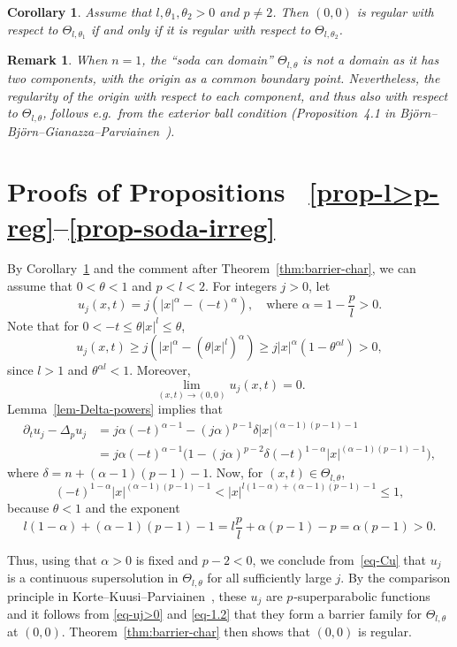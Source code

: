 \documentclass[a4paper, twoside]{article}
\makeatletter
\theoremstyle{propositional}
\newtheorem{cor}[thm]{Corollary}
\theoremstyle{descriptive}
\newtheorem{remark}[thm]{Remark}
\renewenvironment{proof}[1][\proofname]{\par
  \pushQED{\qed}%
  \normalfont
  \trivlist
  \item[\hskip\labelsep
        \itshape
    #1\@addpunct{.}]\ignorespaces
}{%
  \popQED\endtrivlist\@endpefalse
}
\numberwithin{equation}{section}
\newcommand{\al}{\alpha}
\newcommand{\de}{\delta}
\newcommand{\p}{{$p\mspace{1mu}$}}
\makeatother
\begin{document}
\begin{cor} \label{cor-indep-theta}
Assume that $l,\theta_1,\theta_2>0$ and $p \ne 2$. 
Then $(0,0)$ is regular 
with respect to  $\Theta_{l,\theta_1}$ 
if and only if it is
regular 
with respect to  $\Theta_{l,\theta_2}$. 
\end{cor}


\begin{remark} \label{rmk-n=1}
When $n=1$, the ``soda can domain'' $\Theta_{l,\theta}$ is not a domain as 
it has two components, with 
the origin as a common boundary point.
Nevertheless, 
the regularity of the origin with respect to 
each component, and thus also with respect to $\Theta_{l,\theta}$,
follows e.g.\ from
the exterior ball condition 
(Proposition~4.1 
in Bj\"orn--Bj\"orn--Gianazza--Par\-vi\-ain\-en~\cite{BBGP}).
\end{remark}



\section{Proofs of Propositions~
\ref{prop-l>p-reg}--\ref{prop-soda-irreg}
}
\label{sect-pf}

\begin{proof}[Proof of Proposition~\ref{prop-l>p-reg}]
By Corollary~\ref{cor-indep-theta} and the comment after Theorem~\ref{thm:barrier-char},
we can assume that $0<\theta<1$ and $p<l<2$.
For integers $j>0$, let 
\[
   u_j(x,t)= j(|x|^\al - (-t)^\al),
   \quad \text{where $\al=1-\frac{p}{l}>0$.}
\]
Note that for $0<-t \le \theta |x|^l \le \theta$,
\begin{equation}    \label{eq-uj>0}
u_j(x,t) \ge j(|x|^{\al} - (\theta|x|^l)^\al) 
\ge j|x|^\al (1-\theta^{\al l}) > 0,
\end{equation}
since $l>1$ and $\theta^{\al l} <1$.
Moreover, 
\begin{equation} \label{eq-1.2}
\lim_{(x,t)\to(0,0)} u_j(x,t)=0.
\end{equation}
Lemma~\ref{lem-Delta-powers} implies that
\begin{align}
\partial_t u_j 
- \Delta_p u_j &= j\al (-t)^{\al-1} - (j\al)^{p-1}\de |x|^{(\al-1)(p-1)-1} \nonumber \\
    &= j\al (-t)^{\al-1} \bigl( 1 - (j\al)^{p-2}\de (-t)^{1-\al}|x|^{(\al-1)(p-1)-1} \bigr),
\label{eq-Cu}
\end{align}
where $\de=n+(\al-1)(p-1)-1$. 
Now, for $(x,t) \in \Theta_{l,\theta}$,
\[
(-t)^{1-\al}|x|^{(\al-1)(p-1)-1} < |x|^{l(1-\al)+(\al-1)(p-1)-1} \le 1,
\]
because $\theta <1$ and the exponent 
\[ 
l(1-\al)+(\al-1)(p-1)-1 
= l \frac{p}{l} + \al(p-1)-p
= \al(p-1)>0.
\] 


Thus, using that $\al>0$ is fixed and $p-2<0$, we conclude from~\eqref{eq-Cu}
that $u_j$ is 
a continuous supersolution in $\Theta_{l,\theta}$ for 
all sufficiently large $j$.
By  the comparison principle in
Korte--Kuusi--Par\-vi\-ain\-en~\cite[Lemma~3.5]{KoKuPa10}, 
these $u_j$ are \p-superparabolic functions and it follows from \eqref{eq-uj>0}
and \eqref{eq-1.2} that they
form a barrier family for $\Theta_{l,\theta}$ at $(0,0)$.
Theorem~\ref{thm:barrier-char} then shows that $(0,0)$ is regular.
\end{proof}
\end{document}
